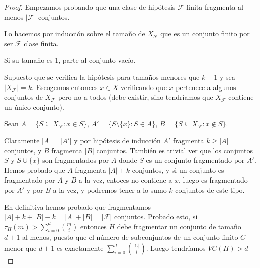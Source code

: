 \begin{proof}
Empezamos probando que una clase de hipótesis $\mathcal{F}$ finita fragmenta al menos $|\mathcal{F}|$ conjuntos.

Lo hacemos por inducción sobre el tamaño de $X_\mathcal{F}$ que es un conjunto finito por ser $\mathcal{F}$ clase finita.

Si su tamaño es 1, parte al conjunto vacío.

Supuesto que se verifica la hipótesis para tamaños menores que $k-1$ y sea $|X_\mathcal{F}| = k$. Escogemos entonces $x\in X$ verificando que $x$ pertenece a algunos conjuntos de $X_\mathcal{F}$ pero no a todos (debe existir, sino tendríamos que $X_\mathcal{F}$ contiene un único conjunto).

Sean $A = \{S \subseteq X_\mathcal{F} : x\in S\}$, $A'=\{S\setminus\{x\} : S \in A\}$, $B= \{S \subseteq X_\mathcal{F} : x\not\in S\}$.

Claramente $|A| = |A'|$ y por hipótesis de inducción $A'$ fragmenta $k \ge |A|$ conjuntos, y $B$ fragmenta $|B|$ conjuntos. También es trivial ver que los conjuntos $S$ y $S\cup \{x\}$ son fragmentados por $A$ donde $S$ es un conjunto fragmentado por $A'$. Hemos probado que $A$ fragmenta $|A| + k$ conjuntos, y si un conjunto es fragmentado por $A$ y $B$ a la vez, entoces no contiene a $x$, luego es fragmentado por $A'$ y por $B$ a la vez, y podremos tener a lo sumo $k$ conjuntos de este tipo.

En definitiva hemos probado que fragmentamos $|A| + k + |B| - k = |A| + |B| = |\mathcal{F}|$ conjuntos.
Probado esto, si $\tau_{H}(m) > \sum_{i=0}^d \binom{m}{i}$ entonces $H$ debe fragmentar un conjunto de tamaño 
$d+1$ al menos, puesto que el número de subconjuntos de un conjunto finito $C$ menor que  $d+1$ es exactamente
$\sum_{i=0}^d \binom{|C|}{i}$. Luego tendríamos $VC(H) > d$
\end{proof}